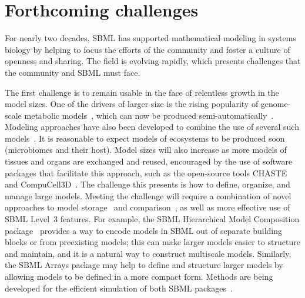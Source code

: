 \documentclass{sbml-paper}
\begin{document}
\hrulefill
\newpage

\section*{Forthcoming challenges}

For nearly two decades, SBML has supported mathematical modeling in systems biology by helping to focus the efforts of the community and foster a culture of openness and sharing.  The field is evolving rapidly, which presents challenges that the community and SBML must face.

The first challenge is to remain usable in the face of relentless growth in the model sizes.  One of the drivers of larger size is the rising popularity of genome-scale metabolic models~\citep{Bordbar2014a}, which can now be produced semi-automatically~\citep{henry2010high, buchel2013path2models, Magnusdottir2017}.  Modeling approaches have also been developed to combine the use of several such models~\citep[e.g.,][]{bordbar2011multi}.  It is reasonable to expect models of ecosystems to be produced soon (\eg microbiomes and their host).  Model sizes will also increase as more models of tissues and organs are exchanged and reused, encouraged by the use of software packages that facilitate this approach, such as the open-source tools CHASTE~\citep{mirams2013chaste} and CompuCell3D~\citep{swat2012multi}.  The challenge this presents is how to define, organize, and manage large models.  Meeting the challenge will require a combination of novel approaches to model storage~\citep[e.g.,][]{Henkel2015combininga} and comparison~\citep[e.g.,][]{Scharm2016algorithm, Scharm2016comodi}, as well as more effective use of SBML Level~3 features.  For example, the SBML Hierarchical Model Composition package~\citep{Smith2015} provides a way to encode models in SBML out of separate building blocks or from preexisting models; this can make larger models easier to structure and maintain, and it is a natural way to construct multiscale models.  Similarly, the SBML Arrays package may help to define and structure larger models by allowing models to be defined in a more compact form.  Methods are being developed for the efficient simulation of both SBML packages~\citep{watanabe2014hierarchical, watanabe2016efficient}.
\end{document}
